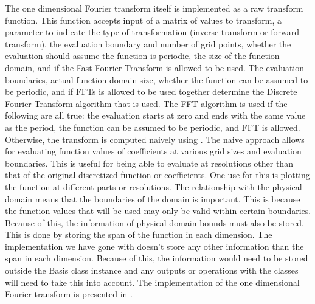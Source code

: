 The one dimensional Fourier transform itself is implemented as a raw transform function. This function accepts input of a matrix of values to transform, a parameter to indicate the type of transformation (inverse transform or forward transform), the evaluation boundary and number of grid points, whether the evaluation should assume the function is periodic, the size of the function domain, and if the Fast Fourier Transform is allowed to be used. The evaluation boundaries, actual function domain size, whether the function can be assumed to be periodic, and if FFTs is allowed to be used together determine the Discrete Fourier Transform algorithm that is used. The FFT algorithm is used if the following are all true: the evaluation starts at zero and ends with the same value as the period, the function can be assumed to be periodic, and FFT is allowed. Otherwise, the transform is computed naively using . The naive approach allows for evaluating function values of coefficients at various grid sizes and evaluation boundaries. This is useful for being able to evaluate at resolutions other than that of the original discretized function or coefficients. One use for this is plotting the function at different parts or resolutions. The relationship with the physical domain means that the boundaries of the domain is important. This is because the function values that will be used may only be valid within certain boundaries. Because of this, the information of physical domain bounds must also be stored. This is done by storing the span of the function in each dimension. The implementation we have gone with doesn't store any other information than the span in each dimension. Because of this, the information would need to be stored outside the Basis class instance and any outputs or operations with the classes will need to take this into account. The implementation of the one dimensional Fourier transform is presented in .

